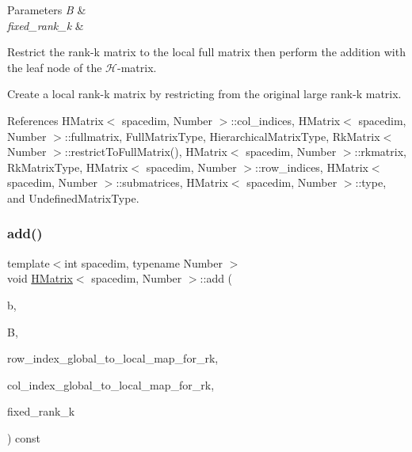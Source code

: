 \begin{DoxyParams}{Parameters}
{\em B} & \\
\hline
{\em fixed\+\_\+rank\+\_\+k} & \\
\hline
\end{DoxyParams}
Restrict the rank-\/k matrix to the local full matrix then perform the addition with the leaf node of the $\mathcal{H}$-\/matrix.

Create a local rank-\/k matrix by restricting from the original large rank-\/k matrix.

References H\+Matrix$<$ spacedim, Number $>$\+::col\+\_\+indices, H\+Matrix$<$ spacedim, Number $>$\+::fullmatrix, Full\+Matrix\+Type, Hierarchical\+Matrix\+Type, Rk\+Matrix$<$ Number $>$\+::restrict\+To\+Full\+Matrix(), H\+Matrix$<$ spacedim, Number $>$\+::rkmatrix, Rk\+Matrix\+Type, H\+Matrix$<$ spacedim, Number $>$\+::row\+\_\+indices, H\+Matrix$<$ spacedim, Number $>$\+::submatrices, H\+Matrix$<$ spacedim, Number $>$\+::type, and Undefined\+Matrix\+Type.

\mbox{\label{classHMatrix_ad3800d6fded523d5c8eeb8fd0c106a34}} 
\subsubsection{\texorpdfstring{add()}{add()}\hspace{0.1cm}{\footnotesize\ttfamily [6/10]}}
{\footnotesize\ttfamily template$<$int spacedim, typename Number $>$ \\
void \hyperlink{classHMatrix}{H\+Matrix}$<$ spacedim, Number $>$\+::add (\begin{DoxyParamCaption}\item[{const Number}]{b,  }\item[{const \hyperlink{classRkMatrix}{Rk\+Matrix}$<$ Number $>$ \&}]{B,  }\item[{const std\+::map$<$ types\+::global\+\_\+dof\+\_\+index, size\+\_\+t $>$ \&}]{row\+\_\+index\+\_\+global\+\_\+to\+\_\+local\+\_\+map\+\_\+for\+\_\+rk,  }\item[{const std\+::map$<$ types\+::global\+\_\+dof\+\_\+index, size\+\_\+t $>$ \&}]{col\+\_\+index\+\_\+global\+\_\+to\+\_\+local\+\_\+map\+\_\+for\+\_\+rk,  }\item[{const \hyperlink{classHMatrix_a5ca8dc549783d38371a01ecd621ecb34}{size\+\_\+type}}]{fixed\+\_\+rank\+\_\+k }\end{DoxyParamCaption}) const}

